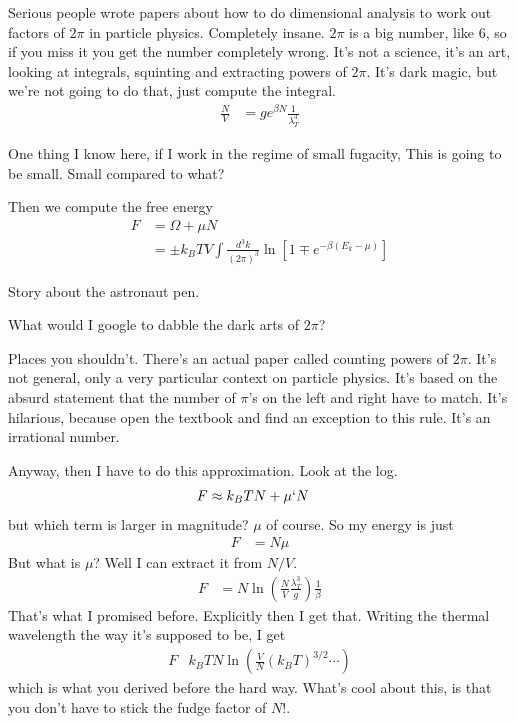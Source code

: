 Serious people wrote papers about how to do dimensional analysis to work out
factors of $2\pi$ in particle physics.
Completely insane.
$2\pi$ is a big number, like 6,
so if you miss it you get the number completely wrong.
It's not a science,
it's an art,
looking at integrals,
squinting and extracting powers of $2\pi$.
It's dark magic, but we're not going to do that,
just compute the integral.
\begin{align}
    \frac{N}{V} &=
    g e^{\beta N} \frac{1}{\lambda_T^3}
\end{align}

One thing I know here,
if I work in the regime of small fugacity,
This is going to be small.
Small compared to what?

Then we compute the free energy
\begin{align}
    F &= \Omega + \mu N\\
    &=
    \pm k_B T V
    \int \frac{d^3k}{(2\pi)^3}
    \ln\left[ 
    1 \mp e^{-\beta \left( E_k - \mu \right)}
    \right]
\end{align}

Story about the astronaut pen.

\begin{question}
    What would I google to dabble the dark arts of $2\pi$?
\end{question}
Places you shouldn't.
There's an actual paper called counting powers of $2\pi$.
It's not general,
only a very particular context on particle physics.
It's based on the absurd statement that the number of $\pi$'s on the left and
right have to match.
It's hilarious,
because open the textbook and find an exception to this rule.
It's an irrational number.

Anyway, then I have to do this approximation.
Look at the log.
\begin{align}
    F &\approx
    k_B T N + \mu` N
\end{align}
but which term is larger in magnitude?
$\mu$ of course.
So my energy is just
\begin{align}
    F &= N\mu
\end{align}
But what is $\mu$?
Well I can extract it from $N/V$.
\begin{align}
    F &=
    N\ln \left( \frac{N}{V} \frac{\lambda_T^3}{g} \right) \frac{1}{\beta}
\end{align}
That's what I promised before.
Explicitly then I get that.
Writing the thermal wavelength the way it's supposed to be,
I get
\begin{align}
    F & k_B T N
    \ln\left( 
    \frac{V}{N} \left( k_B T \right)^{3/2} \cdots
    \right)
\end{align}
which is what you derived before the hard way.
What's cool about this,
is that you don't have to stick the fudge factor of $N!$.

